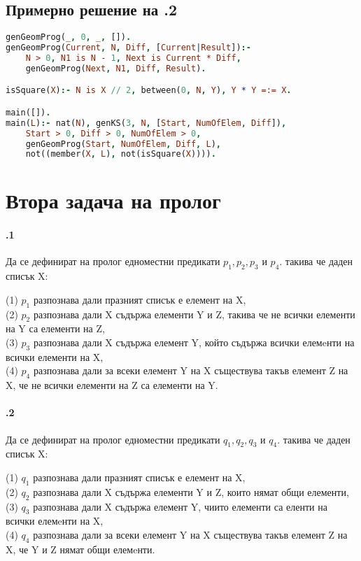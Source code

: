 \documentclass{article}
\begin{document}
\vskip 0.2in

\subsection{Примерно решение на .2} 
\begin{addmargin}[1em]{2em}
\begin{lstlisting}[language=Prolog]
genGeomProg(_, 0, _, []).
genGeomProg(Current, N, Diff, [Current|Result]):-
	N > 0, N1 is N - 1, Next is Current * Diff,
	genGeomProg(Next, N1, Diff, Result).

isSquare(X):- N is X // 2, between(0, N, Y), Y * Y =:= X.

main([]).
main(L):- nat(N), genKS(3, N, [Start, NumOfElem, Diff]),
	Start > 0, Diff > 0, NumOfElem > 0,
	genGeomProg(Start, NumOfElem, Diff, L), 
    not((member(X, L), not(isSquare(X)))).
\end{lstlisting}
\end{addmargin}

\newpage
\section{Втора задача на пролог}

\paragraph{\hspace{0.5em} .1} 
Да се дефинират на пролог едноместни предикати $p_1, p_2, p_3$ и $p_4$. такива че даден списък X:
\begin{addmargin}[1em]{2em}
(1) $p_1$ разпознава дали празният списък е елемент на X, \\
(2) $p_2$ разпознава дали X съдържа елементи Y и Z, такива че не всички елементи на Y са елементи на Z, \\
(3) $p_3$ разпознава дали X съдържа елемент Y, който съдържа всички елемeнти на всички елементи на X, \\
(4) $p_4$ разпознава дали за всеки елемент Y на X съществува такъв елемент Z на X, че не всички елементи на Z са елементи на Y.
\end{addmargin}

\vskip 0.2in

\paragraph{\hspace{0.5em} .2} Да се дефинират на пролог едноместни предикати $q_1, q_2, q_3$ и $q_4$. такива че даден списък X:
\begin{addmargin}[1em]{2em}
(1) $q_1$ разпознава дали празният списък е елемент на X, \\
(2) $q_2$ разпознава дали X съдържа елементи Y и Z, които нямат общи елементи, \\
(3) $q_3$ разпознава дали X съдържа елемент Y, чиито елементи са еленти на всички елемeнти на X, \\
(4) $q_4$ разпознава дали за всеки елемент Y на X съществува такъв елемент Z на X, че Y и Z нямат общи елемeнти.
\end{addmargin}
\end{document}
